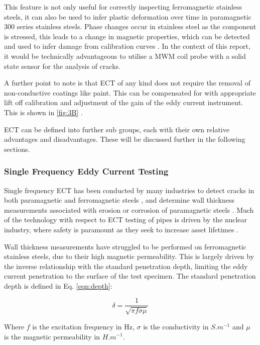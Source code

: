 \documentclass[a4paper,twoside,11pt]{article}
\begin{document}
This feature is not only useful for correctly inspecting ferromagnetic stainless steels, it can also be used to infer plastic deformation over time in paramagnetic 300  series stainless steels.
Phase changes occur in stainless steel as the component is stressed, this leads to a change in magnetic properties, which can be detected and used to infer damage from calibration curves \cite{nagyElectromagneticNDE2019}. 
In the context of this report, it would be technically advantageous to utilise a MWM coil probe with a solid state sensor for the analysis of cracks.

A further point to note is that ECT of any kind does not require the removal of non-conductive coatings like paint.  This can be compensated for with appropriate lift off calibration and adjustment of the gain of the eddy current instrument. This is shown in \ref{fig:3B} \cite{nagyElectromagneticNDE2019}.

ECT can be defined into further sub groups, each with their own relative advantages and disadvantages. These will be discussed further in the following sections.

\newpage
\subsubsection{Single Frequency Eddy Current Testing}

Single frequency ECT has been conducted by many industries to detect cracks in both paramagnetic and ferromagnetic steels \cite{jacksonAssessmentEddyCurrent}, and determine wall thickness measurements associated with erosion or corrosion of paramagnetic steels \cite{dehalleuxEddyCurrentMeasurement1996}. 
Much of the technology with respect to ECT testing of pipes is driven by the nuclear industry, where safety is paramount as they seek to increase asset lifetimes \cite{forsterSensitiveEddycurrentTesting1974}. 

Wall thickness measurements have struggled to be performed on ferromagnetic stainless steels, due to their high magnetic permeability. 
This is largely driven by the inverse relationship with the standard penetration depth, limiting the eddy current penetration to the surface of the test specimen. 
The standard penetration depth is defined in Eq. \ref{eqn:depth}:

\begin{equation} \label{eqn:depth}
\delta=\frac{1}{\sqrt{\pi f \sigma \mu}}
\end{equation}

\noindent Where  $f$  is the excitation frequency in Hz, $\sigma{}$ is the conductivity in  $S.m^{-1}$  and $\mu{}$ is the magnetic permeability in  $H.m^{-1}$.
\end{document}
